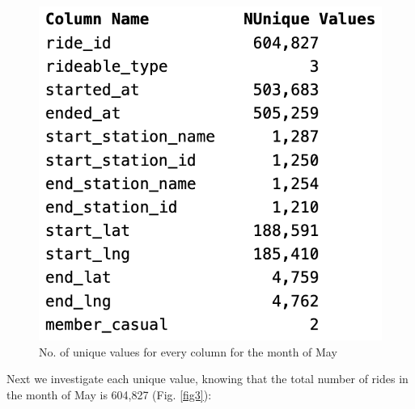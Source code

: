\documentclass[12pt]{article}
\begin{document}
	\begin{figure}[h]
	\centering
	\includegraphics[scale = 0.6]{imgUni.png} 
	\caption{No. of unique values for every column for the month of May}
	\label{fig2}
	\end{figure}
Next we investigate each unique value, knowing that the total number of rides in the month of May is 604,827  (Fig. \underline{\ref{fig3}}):
\end{document}
